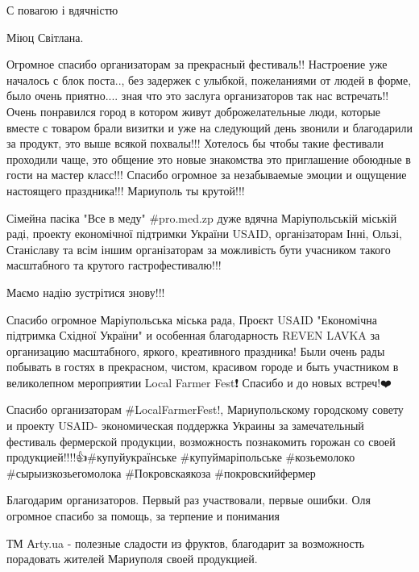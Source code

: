 С повагою і вдячністю

Міюц Світлана.


Огромное спасибо организаторам за прекрасный фестиваль!! Настроение уже
началось с блок поста.., без задержек с улыбкой, пожеланиями от людей в форме,
было очень приятно.... зная что это заслуга организаторов так нас встречать!!
Очень понравился город в котором живут доброжелательные люди, которые вместе с
товаром брали визитки и уже на следующий день звонили и благодарили за
продукт, это выше всякой похвалы!!! Хотелось бы чтобы такие фестивали проходили
чаще, это общение это новые знакомства это приглашение обоюдные в гости на
мастер класс!!! Спасибо огромное за незабываемые эмоции и ощущение настоящего
праздника!!! Мариуполь ты крутой!!!


Сімейна пасіка "Все в меду" \#pro.med.zp дуже вдячна Маріупольській міській
раді, проекту економічної підтримки України USAID, організаторам Інні, Ользі,
Станіславу та всім іншим організаторам за можливість бути учасником такого
масштабного та крутого гастрофестивалю!!!

Маємо надію зустрітися знову!!!


Спасибо огромное Маріупольська міська рада, Проєкт USAID "Економічна підтримка
Східної України" и особенная благодарность REVEN LAVKA за организацию
масштабного, яркого, креативного праздника! Были очень рады побывать в гостях в
прекрасном, чистом, красивом городе и быть участником в великолепном
мероприятии Local Farmer Fest❗️ Спасибо и до новых встреч!❤️



Спасибо организаторам \#LocalFarmerFest!, Мариупольскому городскому совету и
проекту USAID- экономическая поддержка Украины за замечательный фестиваль
фермерской продукции, возможность познакомить горожан со своей
продукцией!!!!👍\#купуйукраїнське \#купуймаріпольське \#козьемолоко
\#сырыизкозьегомолока \#Покровскаякоза \#покровскийфермер


Благодарим организаторов. Первый раз участвовали, первые ошибки. Оля огромное
спасибо за помощь, за терпение и понимания 🥰


ТМ Аrty.ua - полезные сладости из фруктов, благодарит за возможность порадовать
жителей Мариуполя своей продукцией. 🍒🍓🍊🍉

